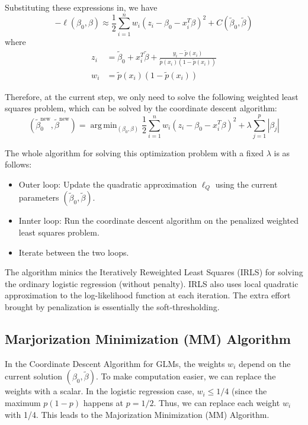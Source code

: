 \documentclass[12pt]{article}
\newcommand{\sumn}{\sum_{i=1}^n}
\newcommand{\btilde}{\tilde{\beta}}
\DeclareMathOperator*{\argmin}{arg\,min}
\numberwithin{equation}{section}
\begin{document}
Substituting these expressions in, we have
%
\begin{equation*}
  -\ell(\beta_0, \beta) \approx \frac{1}{2}
    \sumn w_i(z_i - \beta_0 - x_i^T \beta)^2 + C(\btilde_0, \btilde)
\end{equation*}
%
where
%
\begin{align*}
  z_i &= \btilde_0 + x_i^T \btilde + \frac{y_i - \tilde{p}(x_i)}{\tilde{p}(x_i)(1 - \tilde{p}(x_i))} \\
  w_i &= \tilde{p}(x_i)(1 - \tilde{p}(x_i))
\end{align*}

Therefore, at the current step, we only need to solve the following weighted least squares problem, which can be solved by the coordinate descent algorithm:
\begin{equation*}
  (\btilde_0^{\text{new}}, \btilde^{\text{new}}) = 
    \argmin_{(\beta_0, \beta)} \frac{1}{2} \sumn 
    w_i(z_i - \beta_0 - x_i^T \beta)^2 + \lambda \sum_{j=1}^p |\beta_j|
\end{equation*}


The whole algorithm for solving this optimization problem with a fixed $\lambda$ is as follows:
\begin{itemize}
  \item Outer loop: Update the quadratic approximation $\ell_Q$ using the current parameters $(\btilde_0, \btilde)$.
  \item Innter loop: Run the coordinate descent algorithm on the penalized weighted least squares problem.
  \item Iterate between the two loops.
\end{itemize}

The algorithm minics the Iteratively Reweighted Least Squares (IRLS) for solving the ordinary logistic regression (without penalty). IRLS also uses local quadratic approximation to the log-likelihood function at each iteration. The extra effort brought by penalization is essentially the soft-thresholding.

\subsection{Marjorization Minimization (MM) Algorithm}
In the Coordinate Descent Algorithm for GLMs, the weights $w_i$ depend on the current solution $(\beta_0, \btilde)$. To make computation easier, we can replace the weights with a scalar. In the logistic regression case, $w_i \le 1/4$ (since the maximum $p(1 - p)$ happens at $p = 1/2$. Thus, we can replace each weight $w_i$ with 1/4. This leads to the Majorization Minimization (MM) Algorithm.
\end{document}
